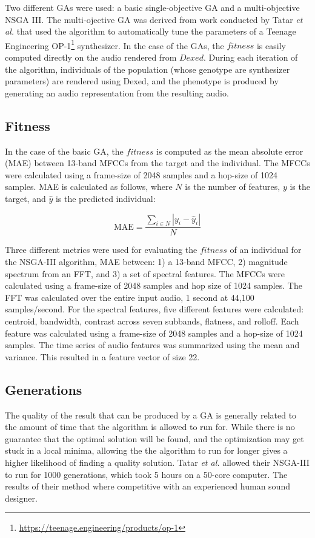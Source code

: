 Two different GAs were used: a basic single-objective GA and a multi-objective NSGA III. The multi-ojective GA was derived from work conducted by Tatar \textit{et al.} \cite{tatar2016automatic} that used the algorithm to automatically tune the parameters of a Teenage Engineering OP-1\footnote{\url{https://teenage.engineering/products/op-1}} synthesizer. In the case of the GAs, the $fitness$ is easily computed directly on the audio rendered from $Dexed$. During each iteration of the algorithm, individuals of the population (whose genotype are synthesizer parameters) are rendered using Dexed, and the phenotype is produced by generating an audio representation from the resulting audio.

\subsection{Fitness}
In the case of the basic GA, the $fitness$ is computed as the mean absolute error (MAE) between 13-band MFCCs from the target and the individual. The MFCCs were calculated using a frame-size of 2048 samples and a hop-size of 1024 samples. MAE is calculated as follows, where $N$ is the number of features, $y$ is the target, and $\hat{y}$ is the predicted individual:

\begin{equation}\label{equation:mae}
    \text{MAE} = \frac{\sum_{i \in N}{|y_i - \hat{y}_i|}}{N}
\end{equation}
 
 Three different metrics were used for evaluating the $fitness$ of an individual for the NSGA-III algorithm, MAE between: 1) a 13-band MFCC, 2) magnitude spectrum from an FFT, and 3) a set of spectral features. The MFCCs were calculated using a frame-size of 2048 samples and hop size of 1024 samples. The FFT was calculated over the entire input audio, 1 second at 44,100 samples/second. For the spectral features, five different features were calculated: centroid, bandwidth, contrast across seven subbands, flatness, and rolloff. Each feature was calculated using a frame-size of 2048 samples and a hop-size of 1024 samples. The time series of audio features was summarized using the mean and variance. This resulted in a feature vector of size 22.
 
 \subsection{Generations}
 The quality of the result that can be produced by a GA is generally related to the amount of time that the algorithm is allowed to run for. While there is no guarantee that the optimal solution will be found, and the optimization may get stuck in a local minima, allowing the the algorithm to run for longer gives a higher likelihood of finding a quality solution. Tatar \textit{et al.} allowed their NSGA-III to run for 1000 generations, which took 5 hours on a 50-core computer. The results of their method where competitive with an experienced human sound designer.
 
